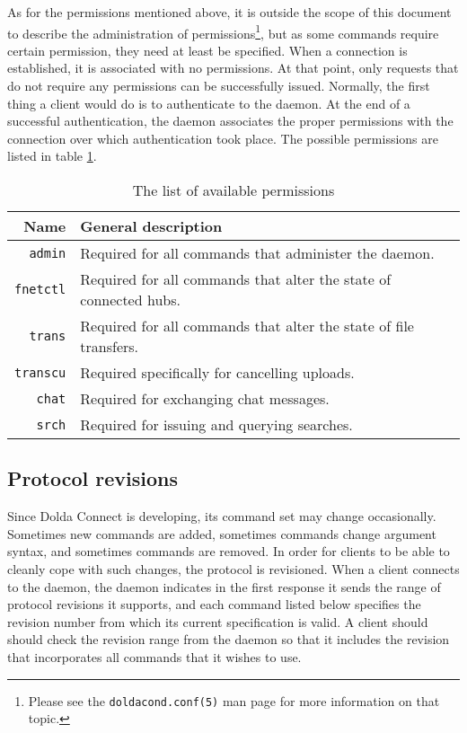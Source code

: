 \documentclass[twoside,a4paper,11pt]{article}
\begin{document}
As for the permissions mentioned above, it is outside the scope of
this document to describe the administration of
permissions\footnote{Please see the \texttt{doldacond.conf(5)} man
  page for more information on that topic.}, but as some commands
require certain permission, they need at least be specified. When a
connection is established, it is associated with no permissions. At
that point, only requests that do not require any permissions can be
successfully issued. Normally, the first thing a client would do is to
authenticate to the daemon. At the end of a successful authentication,
the daemon associates the proper permissions with the connection over
which authentication took place. The possible permissions are listed
in table \ref{tab:perm}.

\begin{table}
  \begin{tabular}{rl}
    Name & General description \\
    \hline
    \texttt{admin} & Required for all commands that administer the
    daemon. \\
    \texttt{fnetctl} & Required for all commands that alter the state of
    connected hubs. \\
    \texttt{trans} & Required for all commands that alter the state of
    file transfers. \\
    \texttt{transcu} & Required specifically for cancelling uploads. \\
    \texttt{chat} & Required for exchanging chat messages. \\
    \texttt{srch} & Required for issuing and querying searches. \\
  \end{tabular}
  \caption{The list of available permissions}
  \label{tab:perm}
\end{table}

\subsection{Protocol revisions}
\label{rev}
Since Dolda Connect is developing, its command set may change
occasionally. Sometimes new commands are added, sometimes commands
change argument syntax, and sometimes commands are removed. In order
for clients to be able to cleanly cope with such changes, the protocol
is revisioned. When a client connects to the daemon, the daemon
indicates in the first response it sends the range of protocol
revisions it supports, and each command listed below specifies the
revision number from which its current specification is valid. A
client should should check the revision range from the daemon so that
it includes the revision that incorporates all commands that it wishes
to use.
\end{document}
